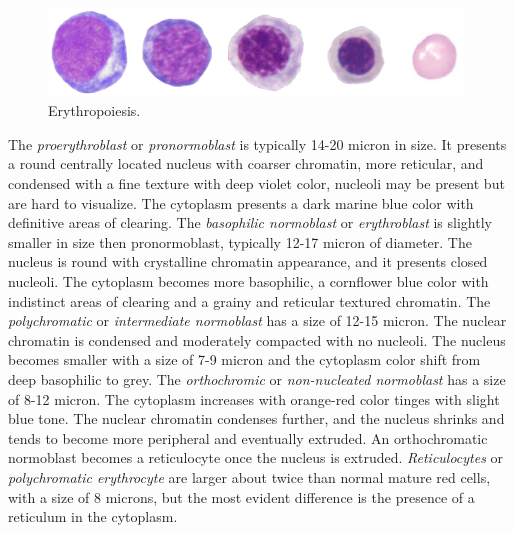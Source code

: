 \documentclass[final,a4paper,12pt,english]{UnicaPhdThesis3}
\begin{document}
{\begin{figure}[!htbp]
\centering
\includegraphics[width=0.98\textwidth]{images/erythropoiesis}
\caption{\label{fig:Erythropoiesis} Erythropoiesis.}
\end{figure}

The \textit{proerythroblast} or \textit{pronormoblast} is typically 14-20 micron in size. It presents a round centrally located nucleus with coarser chromatin, more reticular, and condensed with a fine texture with deep violet color, nucleoli may be present but are hard to visualize. The cytoplasm presents a dark marine blue color with definitive areas of clearing. The \textit{basophilic normoblast} or \textit{erythroblast} is slightly smaller in size then pronormoblast, typically 12-17 micron of diameter. The nucleus is round with crystalline chromatin appearance, and it presents closed nucleoli. The cytoplasm becomes more basophilic, a cornflower blue color with indistinct areas of clearing and a grainy and reticular textured chromatin. The \textit{polychromatic} or \textit{intermediate normoblast} has a size of 12-15 micron. The nuclear chromatin is condensed and moderately compacted with no nucleoli.
The nucleus becomes smaller with a size of 7-9 micron and the cytoplasm color shift from deep basophilic to grey. The \textit{orthochromic} or \textit{non-nucleated normoblast} has a size of 8-12 micron. The cytoplasm increases with orange-red color tinges with slight blue tone. The nuclear chromatin condenses further, and the nucleus shrinks and tends to become more peripheral and eventually extruded. An orthochromatic normoblast becomes a reticulocyte once the nucleus is extruded. \textit{Reticulocytes} or \textit{polychromatic erythrocyte} are larger about twice than normal mature red cells, with a size of 8 microns, but the most evident difference is the presence of a reticulum in the cytoplasm.
}
\end{document}
